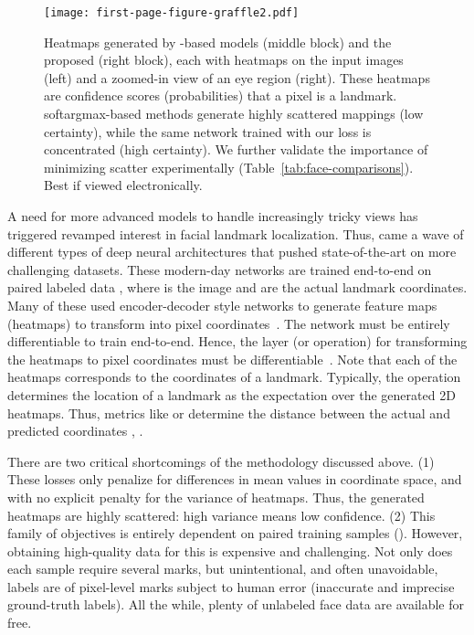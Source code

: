 \documentclass[10pt,twocolumn,letterpaper]{article}
\begin{document}
\begin{figure}
    \centering
    \texttt{[image: first-page-figure-graffle2.pdf]}
    \caption{Heatmaps generated by -based models (middle block) and the proposed  (right block), each with heatmaps on the input images (left) and a zoomed-in view of an eye region (right). These heatmaps are confidence scores (\ie probabilities) that a pixel is a landmark. softargmax-based methods generate highly scattered mappings (low certainty), while the same network trained with our loss is concentrated (\ie high certainty). We further validate the importance of minimizing scatter experimentally (Table~\ref{tab:face-comparisons}). Best if viewed electronically.} 
    \label{fig:kl-versus-softargmax}
\end{figure}


A need for more advanced models to handle increasingly tricky views has triggered revamped interest in facial landmark localization. Thus, came a wave of different types of deep neural architectures that pushed state-of-the-art on more challenging datasets. These modern-day networks are trained end-to-end on paired labeled data , where  is the image and  are the actual landmark coordinates. Many of these used encoder-decoder style networks to generate feature maps (\ie heatmaps) to transform into pixel coordinates~\cite{newell2016stacked,peng2018red, yang2017stacked}. The network must be entirely differentiable to train end-to-end. Hence, the layer (or operation) for transforming the  heatmaps to pixel coordinates must be differentiable~\cite{honari2018improving}. Note that each of the  heatmaps corresponds to the coordinates of a landmark. Typically, the  operation determines the location of a landmark as the expectation over the generated 2D heatmaps. Thus, metrics like or determine the distance between the actual and predicted coordinates , \ie .


There are two critical shortcomings of the methodology discussed above. (1) These losses only penalize for differences in mean values in coordinate space, and with no explicit penalty for the variance of heatmaps. Thus, the generated heatmaps are highly scattered: high variance means low confidence. (2) This family of objectives is entirely dependent on paired training samples (\ie ). However, obtaining high-quality data for this is expensive and challenging. Not only does each sample require several marks, but unintentional, and often unavoidable, labels are of pixel-level marks subject to human error (\ie inaccurate and imprecise ground-truth labels). All the while, plenty of unlabeled face data are available for free. 
\end{document}
